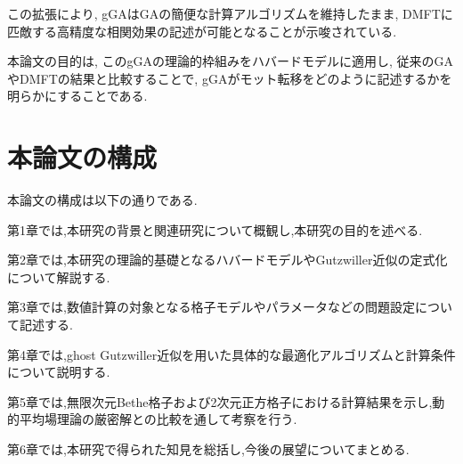 この拡張により, gGAはGAの簡便な計算アルゴリズムを維持したまま, DMFTに匹敵する高精度な相関効果の記述が可能となることが示唆されている. 

本論文の目的は, このgGAの理論的枠組みをハバードモデルに適用し, 従来のGAやDMFTの結果と比較することで, gGAがモット転移をどのように記述するかを明らかにすることである.
\section{本論文の構成}

本論文の構成は以下の通りである.

第1章では,本研究の背景と関連研究について概観し,本研究の目的を述べる.

第2章では,本研究の理論的基礎となるハバードモデルやGutzwiller近似の定式化について解説する.

第3章では,数値計算の対象となる格子モデルやパラメータなどの問題設定について記述する.

第4章では,ghost Gutzwiller近似を用いた具体的な最適化アルゴリズムと計算条件について説明する.

第5章では,無限次元Bethe格子および2次元正方格子における計算結果を示し,動的平均場理論の厳密解との比較を通して考察を行う.

第6章では,本研究で得られた知見を総括し,今後の展望についてまとめる.

